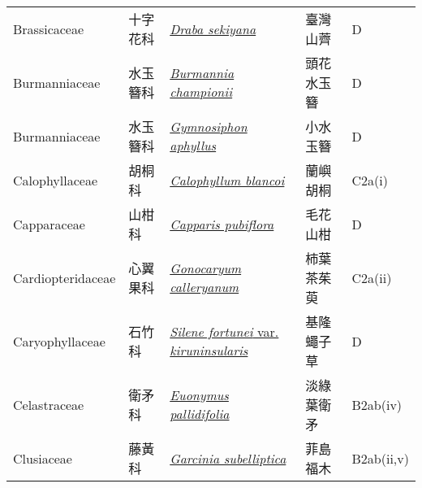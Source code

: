 {\begin{longtable}{L{2.5cm}L{2cm}L{5cm}L{2.5cm}L{3cm}}
    Brassicaceae & 十字花科 & \href{http://www.theplantlist.org/tpl1.1/search?q=Draba+sekiyana}{\textit{Draba sekiyana} } & 臺灣山薺 & D    \\
    Burmanniaceae & 水玉簪科 & \href{http://www.theplantlist.org/tpl1.1/search?q=Burmannia+championii}{\textit{Burmannia championii} } & 頭花水玉簪 & D    \\
    Burmanniaceae & 水玉簪科 & \href{http://www.theplantlist.org/tpl1.1/search?q=Gymnosiphon+aphyllus}{\textit{Gymnosiphon aphyllus} } & 小水玉簪 & D    \\
    Calophyllaceae & 胡桐科 & \href{http://www.theplantlist.org/tpl1.1/search?q=Calophyllum+blancoi}{\textit{Calophyllum blancoi} } & 蘭嶼胡桐 & C2a(i)    \\
    Capparaceae & 山柑科 & \href{http://www.theplantlist.org/tpl1.1/search?q=Capparis+pubiflora}{\textit{Capparis pubiflora} } & 毛花山柑 & D    \\
    Cardiopteridaceae & 心翼果科 & \href{http://www.theplantlist.org/tpl1.1/search?q=Gonocaryum+calleryanum}{\textit{Gonocaryum calleryanum} } & 柿葉茶茱萸 & C2a(ii)    \\
    Caryophyllaceae & 石竹科 & \href{http://www.theplantlist.org/tpl1.1/search?q=Silene+fortunei+var.+kiruninsularis}{\textit{Silene fortunei} var. \textit{kiruninsularis} } & 基隆蠅子草 & D    \\
    Celastraceae & 衛矛科 & \href{http://www.theplantlist.org/tpl1.1/search?q=Euonymus+pallidifolia}{\textit{Euonymus pallidifolia} } & 淡綠葉衛矛 & B2ab(iv)    \\
    Clusiaceae & 藤黃科 & \href{http://www.theplantlist.org/tpl1.1/search?q=Garcinia+subelliptica}{\textit{Garcinia subelliptica} } & 菲島福木 & B2ab(ii,v)    \\

\end{longtable}}

